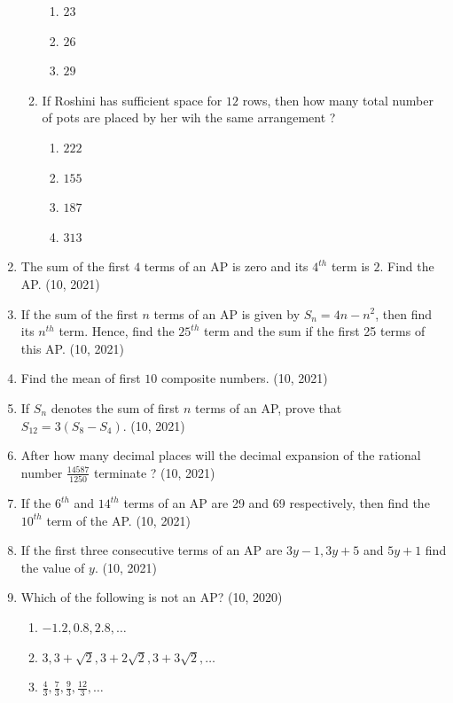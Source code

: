 \begin{enumerate}[label=\thesubsection.\arabic*,ref=\thesubsection.\theenumi,itemsep=1pt]
\begin{enumerate}
\begin{multicols}{4}
\begin{enumerate}
					 \item $23$
					 \item $26$
					 \item $29$
				\end{enumerate}
\end{multicols}
			 \item If Roshini has sufficient space for $12$ rows, then how many total number of pots are placed by her wih the same arrangement ?
				\begin{multicols}{4}
\begin{enumerate}    
					 \item $222$
					 \item $155$
					 \item $187$
					 \item $313$
				\end{enumerate}
\end{multicols}
		\end{enumerate} 
	 \item The sum of the first $4$ terms of an AP is zero and its $4^{th}$ term is $2$. Find the AP.
	\hfill (10, 2021) \item If the sum of the first $n$ terms of an AP is given by $S_n = 4n - n^2$, then find its $n^{th}$ term. Hence, find the $25^{th}$ term and the sum if the first 25 terms of this AP.
\hfill (10, 2021)
	 \item Find the mean of first $10$ composite numbers.
	\hfill (10, 2021) \item If $S_n$ denotes the sum of first $n$ terms of an AP, prove that $S_{12} = 3(S_8 - S_4)$.
%
	\hfill (10, 2021) \item After how many decimal places will the decimal expansion of the rational number $\frac{14587}{1250}$ terminate ?			
\hfill (10, 2021)
	 \item If the $6^{th}$ and $14^{th}$ terms of an AP are 29 and 69 respectively, then find the $10^{th}$ term of the AP.
	\hfill (10, 2021) \item If the first three consecutive terms of an AP are $3y-1, 3y+5$ and $5y+1$ find the value of $y$. 
\hfill (10, 2021)
 \item Which of the following is not an AP? 
\hfill (10, 2020)
\begin{multicols}{2}
\begin{enumerate}    
               \item $-1.2,0.8,2.8,\dots$ 
	        \item $3,3+\sqrt2,3+2\sqrt2,3+3\sqrt2,\dots$ 
	        \item $\frac{4}{3},\frac{7}{3},\frac{9}{3},\frac{12}{3},\dots$ 

\end{enumerate}
\end{multicols}
\end{enumerate}
